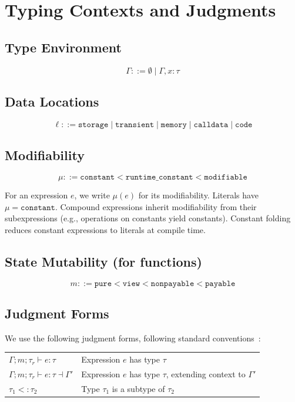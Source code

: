 \documentclass[11pt]{article}
\newcommand{\kw}[1]{\texttt{#1}}
\newcommand{\subtype}[2]{#1 <: #2}
\begin{document}
\section{Typing Contexts and Judgments}

\subsection{Type Environment}

\[
\Gamma ::= \emptyset \mid \Gamma, x : \tau
\]

\subsection{Data Locations}

\[
\ell ::= \kw{storage} \mid \kw{transient} \mid \kw{memory} \mid \kw{calldata} \mid \kw{code}
\]

\subsection{Modifiability}

\[
\mu ::= \kw{constant} < \kw{runtime\_constant} < \kw{modifiable}
\]

For an expression $e$, we write $\mu(e)$ for its modifiability. Literals have $\mu = \kw{constant}$.
Compound expressions inherit modifiability from their subexpressions (e.g., operations on
constants yield constants). Constant folding reduces constant expressions to literals at compile time.

\subsection{State Mutability (for functions)}

\[
m ::= \kw{pure} < \kw{view} < \kw{nonpayable} < \kw{payable}
\]

\subsection{Judgment Forms}

We use the following judgment forms, following standard conventions~\cite{pierce2002types,dunfield2013complete}:

\begin{center}
\begin{tabular}{ll}
$\Gamma; m; \tau_r \vdash e : \tau$ & Expression $e$ has type $\tau$ \\
$\Gamma; m; \tau_r \vdash e : \tau \dashv \Gamma'$ & Expression $e$ has type $\tau$, extending context to $\Gamma'$ \\
$\subtype{\tau_1}{\tau_2}$ & Type $\tau_1$ is a subtype of $\tau_2$ \\
\end{tabular}
\end{center}
\end{document}
